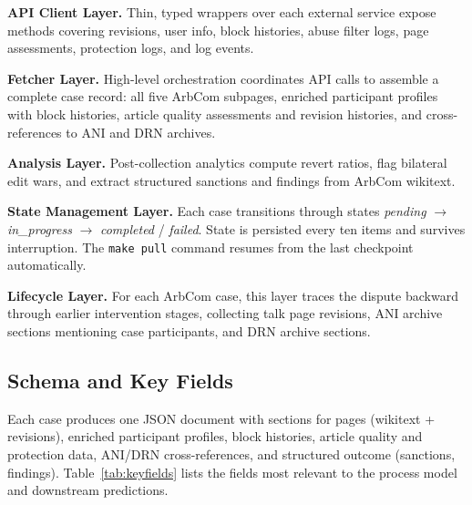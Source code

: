 \documentclass[conference]{IEEEtran}
\begin{document}
\noindent\textbf{API Client Layer.}
Thin, typed wrappers over each external service expose methods covering
revisions, user info, block histories, abuse filter logs, page assessments,
protection logs, and log events.

\noindent\textbf{Fetcher Layer.}
High-level orchestration coordinates API calls to assemble a complete case
record: all five ArbCom subpages, enriched participant profiles with block
histories, article quality assessments and revision histories, and
cross-references to ANI and DRN archives.

\noindent\textbf{Analysis Layer.}
Post-collection analytics compute revert ratios, flag bilateral edit wars,
and extract structured sanctions and findings from ArbCom wikitext.

\noindent\textbf{State Management Layer.}
Each case transitions through states \textit{pending} $\rightarrow$
\textit{in\_progress} $\rightarrow$ \textit{completed} / \textit{failed}.
State is persisted every ten items and survives interruption. The
\texttt{make pull} command resumes from the last checkpoint automatically.

\noindent\textbf{Lifecycle Layer.}
For each ArbCom case, this layer traces the dispute backward through earlier
intervention stages, collecting talk page revisions, ANI archive sections
mentioning case participants, and DRN archive sections.

\subsection{Schema and Key Fields}

Each case produces one JSON document with sections for pages (wikitext +
revisions), enriched participant profiles, block histories, article quality
and protection data, ANI/DRN cross-references, and structured outcome
(sanctions, findings). Table~\ref{tab:keyfields} lists the fields most
relevant to the process model and downstream predictions.
\end{document}
